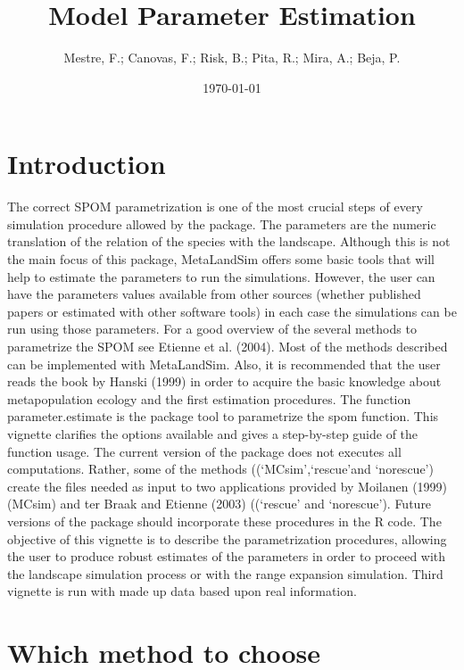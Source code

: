 \documentclass{article}\usepackage[]{graphicx}\usepackage[]{xcolor}
\title{Model Parameter Estimation}
\author{Mestre, F.; Canovas, F.; Risk, B.; Pita, R.; Mira, A.; Beja, P.}
\date{\today}
\begin{document}
\maketitle

\section{Introduction}

The correct SPOM parametrization is one of the most crucial steps of every simulation procedure allowed by the package. The parameters are the numeric translation of the relation of the species with the landscape. 
Although this is not the main focus of this package, MetaLandSim offers some basic tools that will help to estimate the parameters to run the simulations. However, the user can have the parameters values available from other sources (whether published papers or estimated with other software tools) in each case the simulations can be run using those parameters. 
For a good overview of the several methods to parametrize the SPOM see Etienne et al. (2004). Most of the methods described can be implemented with MetaLandSim. Also, it is recommended that the user reads the book by Hanski (1999) in order to acquire the basic knowledge about metapopulation ecology and the first estimation procedures.
The function parameter.estimate is the package tool to parametrize the spom function. This vignette clarifies the options available and gives a step-by-step guide of the function usage.
The current version of the package does not executes all computations. Rather, some of the methods ((`MCsim',`rescue'and `norescue') create the files needed as input to two applications provided by Moilanen (1999) (MCsim) and ter Braak and Etienne (2003) ((`rescue' and `norescue'). Future versions of the package should incorporate these procedures in the R code.
The objective of this vignette is to describe the parametrization procedures, allowing the user to produce robust estimates of the parameters in order to proceed with the landscape simulation process or with the range expansion simulation.
Third vignette is run with made up data based upon real information.\\

\section{Which method to choose}
\end{document}
